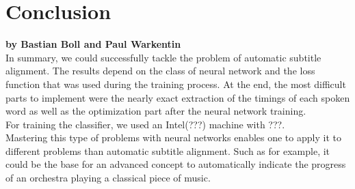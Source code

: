 \chapter{Conclusion}

\textbf{by Bastian Boll and Paul Warkentin} \\

In summary, we could successfully tackle the problem of automatic subtitle alignment. The results depend on the class of neural network and the loss function that was used during the training process. At the end, the most difficult parts to implement were the nearly exact extraction of the timings of each spoken word as well as the optimization part after the neural network training. \\

For training the classifier, we used an Intel(???) machine with ???. \\

Mastering this type of problems with neural networks enables one to apply it to different problems than automatic subtitle alignment. Such as for example, it could be the base for an advanced concept to automatically indicate the progress of an orchestra playing a classical piece of music.
